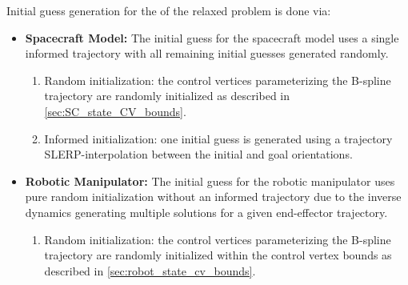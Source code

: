 Initial guess generation for the of the relaxed problem is done via:
\begin{itemize}
    \item \textbf{Spacecraft Model:} 
    The initial guess for the spacecraft model uses a single informed trajectory with all remaining initial guesses generated randomly.
    \begin{enumerate}
        \item Random initialization: the control vertices parameterizing the B-spline trajectory are randomly initialized as described in \cref{sec:SC_state_CV_bounds}.
        \item Informed initialization: one initial guess is generated using a trajectory \ac{SLERP}-interpolation between the initial and goal orientations.
    \end{enumerate}

    \item \textbf{Robotic Manipulator:} 
    The initial guess for the robotic manipulator uses pure random initialization without an informed trajectory due to the inverse dynamics generating multiple solutions for a given end-effector trajectory.
    \begin{enumerate}
        \item Random initialization: the control vertices parameterizing the B-spline trajectory are randomly initialized within the control vertex bounds as described in \cref{sec:robot_state_cv_bounds}.
    \end{enumerate}
\end{itemize}


